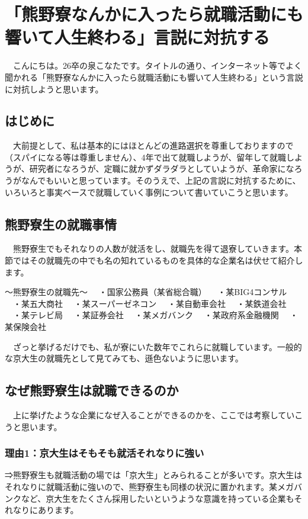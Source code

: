 \section{「熊野寮なんかに入ったら就職活動にも響いて人生終わる」言説に対抗する}

　こんにちは。26卒の泉こなたです。タイトルの通り、インターネット等でよく聞かれる「熊野寮なんかに入ったら就職活動にも響いて人生終わる」という言説に対抗しようと思います。

\subsection{はじめに}
　大前提として、私は基本的にはほとんどの進路選択を尊重しておりますので（スパイになる等は尊重しません）、4年で出て就職しようが、留年して就職しようが、研究者になろうが、定職に就かずダラダラとしていようが、革命家になろうがなんでもいいと思っています。そのうえで、上記の言説に対抗するために、いろいろと事実ベースで就職していく事例について書いていこうと思います。

\subsection{熊野寮生の就職事情}
　熊野寮生でもそれなりの人数が就活をし、就職先を得て退寮していきます。本節ではその就職先の中でも名の知れているものを具体的な企業名は伏せて紹介します。

～熊野寮生の就職先～
　・国家公務員（某省総合職）
　・某BIG4コンサル
　・某五大商社
　・某スーパーゼネコン
　・某自動車会社
　・某鉄道会社
　・某テレビ局
　・某証券会社
　・某メガバンク
　・某政府系金融機関
　・某保険会社

　ざっと挙げるだけでも、私が寮にいた数年でこれらに就職しています。一般的な京大生の就職先として見てみても、遜色ないように思います。

\subsection{なぜ熊野寮生は就職できるのか}
　上に挙げたような企業になぜ入ることができるのかを、ここでは考察していこうと思います。

\subsubsection{理由1：京大生はそもそも就活それなりに強い}
⇒熊野寮生も就職活動の場では「京大生」とみられることが多いです。京大生はそれなりに就職活動に強いので、熊野寮生も同様の状況に置かれます。某メガバンクなど、京大生をたくさん採用したいというような意識を持っている企業もそれなりにあります。

